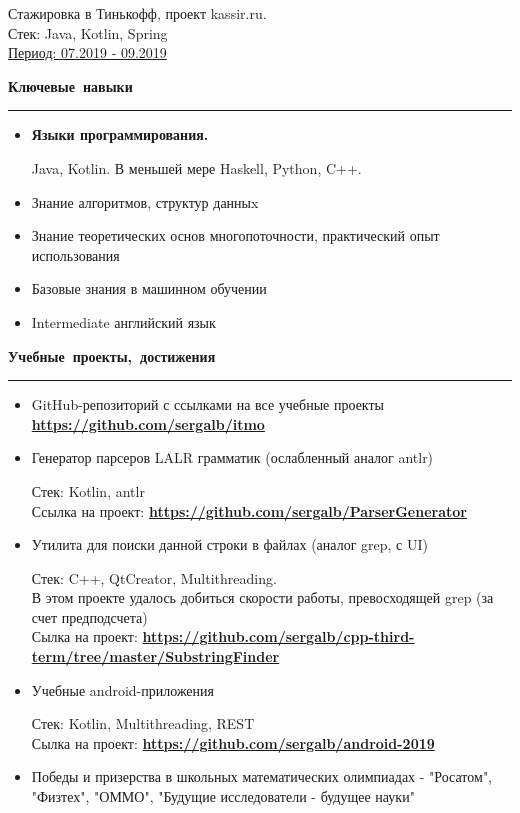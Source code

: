 \documentclass[12pt, a4paper]{report}
\begin{document}
    Стажировка в Тинькофф, проект kassir.ru. \\
    Стек: Java, Kotlin, Spring \\
    \underline{Период: 07.2019 - 09.2019} \\


    \par\hbox{\large\textbf{Ключевые навыки}}\kern5pt\hrule\kern5pt

    \begin{itemize}

        \item \textbf{Языки программирования.}

        Java, Kotlin. В меньшей мере Haskell, Python, C++.

        \item Знание алгоритмов, структур данныx
        \item Знание теоретических основ многопоточности, практический опыт использования
        \item Базовые знания в машинном обучении
        \item Intermediate английский язык
    \end{itemize}

    \par\hbox{\large\textbf{Учебные проекты, достижения}}\kern5pt\hrule\kern5pt
    \begin{itemize}

        \item GitHub-репозиторий с ссылками на все учебные проекты \textbf{\url{https://github.com/sergalb/itmo}}

        \item Генератор парсеров LALR грамматик (ослабленный аналог antlr)

        Стек: Kotlin, antlr\\
        Ссылка на проект:
        \textbf{
        \url{https://github.com/sergalb/ParserGenerator}
        }

        \item Утилита для поиски данной строки в файлах (аналог grep, с UI)

        Стек: C++, QtCreator, Multithreading.\\
        В этом проекте удалось добиться скорости работы, превосходящей grep (за счет предподсчета)\\
        Сылка на проект:
        \textbf{
        \url{https://github.com/sergalb/cpp-third-term/tree/master/SubstringFinder}
        }

        \item Учебные android-приложения

        Стек: Kotlin, Multithreading, REST\\
        Сылка на проект:
        \textbf{
        \url{https://github.com/sergalb/android-2019}
        }

        \item Победы и призерства в школьных математических олимпиадах - "Росатом", "Физтех", "ОММО", "Будущие исследователи - будущее науки"

    \end{itemize}
\end{document}
